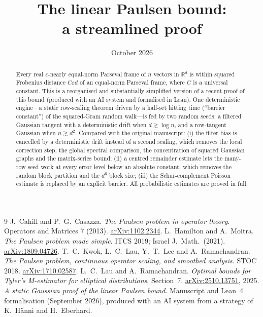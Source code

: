 \documentclass[11pt]{article}
\title{The linear Paulsen bound:\\ a streamlined proof}
\author{}
\date{October 2026}
\theoremstyle{definition}
\theoremstyle{remark}
\newcommand{\R}{\mathbb R}
\newcommand{\eps}{\varepsilon}
\numberwithin{equation}{section}
\begin{document}
\maketitle
\vspace{-1.5em}
\begin{abstract}
Every real $\eps$-nearly equal-norm Parseval frame of $n$ vectors in $\R^d$
is within squared Frobenius distance $C\eps d$ of an equal-norm Parseval frame,
where $C$ is a universal constant. This is a reorganised and substantially
simplified version of a recent proof of this bound (produced with an AI system
and formalised in Lean). One deterministic engine---a static row-scaling theorem
driven by a half-set hitting time (``barrier constant'') of the squared-Gram
random walk---is fed by two random seeds: a filtered Gaussian tangent with a
deterministic drift when $d\gtrsim\log n$, and a row-tangent Gaussian when
$n\gtrsim d^2$. Compared with the original manuscript: (i) the filter bias is
cancelled by a deterministic drift instead of a second scaling, which removes
the local correction step, the global spectral comparison, the concentration of
squared Gaussian graphs and the matrix-series bound; (ii) a centred remainder
estimate lets the many-row seed work at every error level below an absolute
constant, which removes the random block partition and the $d^6$ block size;
(iii) the Schur-complement Poisson estimate is replaced by an explicit barrier.
All probabilistic estimates are proved in full.
\end{abstract}

\tableofcontents







\appendix



\begin{thebibliography}{9}
J.~Cahill and P.~G.~Casazza.
\emph{The Paulsen problem in operator theory}.
Operators and Matrices 7 (2013).
\href{https://arxiv.org/abs/1102.2344}{arXiv:1102.2344}.
L.~Hamilton and A.~Moitra.
\emph{The Paulsen problem made simple}.
ITCS 2019; Israel J.\ Math.\ (2021).
\href{https://arxiv.org/abs/1809.04726}{arXiv:1809.04726}.
T.~C.~Kwok, L.~C.~Lau, Y.~T.~Lee and A.~Ramachandran.
\emph{The Paulsen problem, continuous operator scaling, and smoothed analysis}.
STOC 2018.
\href{https://arxiv.org/abs/1710.02587}{arXiv:1710.02587}.
L.~C.~Lau and A.~Ramachandran.
\emph{Optimal bounds for Tyler's M-estimator for elliptical distributions},
Section~7.
\href{https://arxiv.org/abs/2510.13751}{arXiv:2510.13751}, 2025.
\emph{A static Gaussian proof of the linear Paulsen bound}.
Manuscript and Lean~4 formalisation (September 2026), produced with an AI
system from a strategy of K.~H\"anni and H.~Eberhard.
\end{thebibliography}
\end{document}
